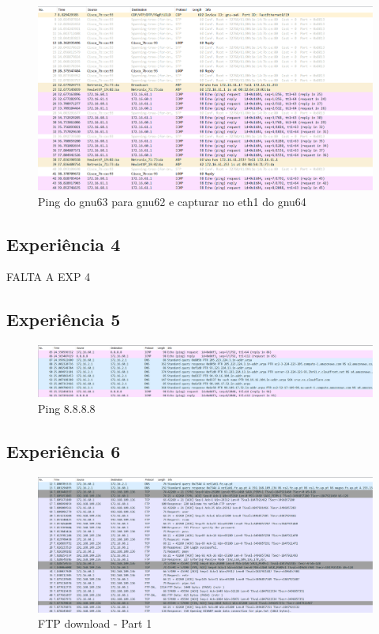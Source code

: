 \documentclass[article, a4paper, 11pt, oneside]{memoir}
\begin{document}
\begin{figure}[h]
	\centering
\includegraphics[scale=0.55]{exp3-step10-ping-gnu62-from-gnu63-eth1.png}
\caption{Ping do gnu63 para gnu62 e capturar no eth1 do gnu64}
\end{figure}

\subsection{Experiência 4}
FALTA A EXP 4

\newpage
\subsection{Experiência 5}
\begin{figure}[h]
	\centering
\includegraphics[scale=0.55]{exp5-step3.png}
\caption{Ping 8.8.8.8}
\end{figure}


\subsection{Experiência 6}
\begin{figure}[h]
	\centering
\includegraphics[scale=0.55]{exp6-step3-part1.png}
\caption{FTP download - Part 1}
\end{figure}
\end{document}
